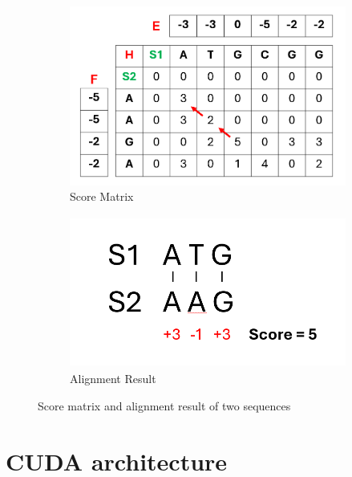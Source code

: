 \documentclass[PhD]{PHlab-thesis}
\begin{document}
\begin{figure}[h]
    \centering
    \begin{subfigure}{0.9\textwidth}
        \centering
        \includegraphics[width=\textwidth]{figures/scoreMatrix.png}
        \caption{Score Matrix}
        \label{fig:Score Matrix}
    \end{subfigure}

    \vspace{0.5cm}

    \begin{subfigure}{0.9\textwidth}
        \centering
        \includegraphics[height=5cm]{figures/alignmentResult.png}
        \caption{Alignment Result}
        \label{fig:Alignment Result}
    \end{subfigure}

    \caption{Score matrix and alignment result of two sequences}
    \label{fig:ScoreMatrixAlignmentResult}
\end{figure}



\clearpage
\section{CUDA architecture}
\end{document}
